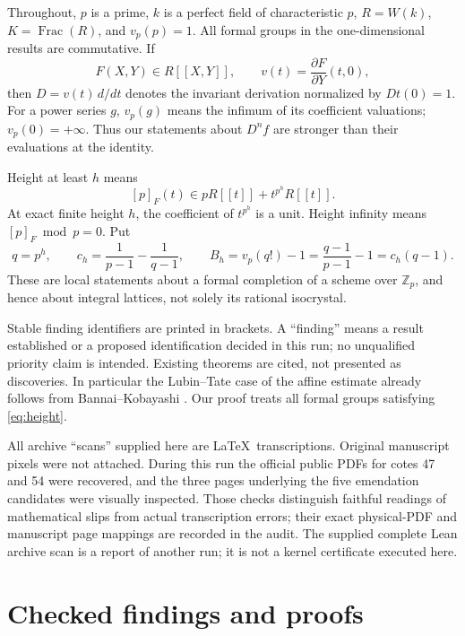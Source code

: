 \documentclass[11pt,a4paper]{article}
\theoremstyle{definition}\newtheorem{remark}[theorem]{Remark}
\newcommand{\Z}{\mathbb Z}\newcommand{\Q}{\mathbb Q}\newcommand{\F}{\mathbb F}
\newcommand{\vp}{v_p}\newcommand{\dR}{\mathrm{dR}}\newcommand{\crys}{\mathrm{crys}}
\begin{document}
Throughout, $p$ is a prime, $k$ is a perfect field of characteristic $p$, $R=W(k)$, $K=\operatorname{Frac}(R)$, and $\vp(p)=1$. All formal groups in the one-dimensional results are commutative. If
\[
 F(X,Y)\in R[[X,Y]],\qquad v(t)=\frac{\partial F}{\partial Y}(t,0),
\]
then $D=v(t)\,d/dt$ denotes the invariant derivation normalized by $Dt(0)=1$. For a power series $g$, $\vp(g)$ means the infimum of its coefficient valuations; $\vp(0)=+\infty$. Thus our statements about $D^n f$ are stronger than their evaluations at the identity.

Height at least $h$ means
\begin{equation}\label{eq:height}
 [p]_F(t)\in pR[[t]]+t^{p^h}R[[t]].
\end{equation}
At exact finite height $h$, the coefficient of $t^{p^h}$ is a unit. Height infinity means $[p]_F\bmod p=0$. Put
\begin{equation}\label{eq:constants}
 q=p^h,\qquad c_h=\frac1{p-1}-\frac1{q-1},\qquad
 B_h=\vp(q!)-1=\frac{q-1}{p-1}-1=c_h(q-1).
\end{equation}
These are local statements about a formal completion of a scheme over $\Z_p$, and hence about integral lattices, not solely its rational isocrystal.

Stable finding identifiers are printed in brackets. A ``finding'' means a result established or a proposed identification decided in this run; no unqualified priority claim is intended. Existing theorems are cited, not presented as discoveries. In particular the Lubin--Tate case of the affine estimate already follows from Bannai--Kobayashi \cite[\S2, p.~527; Propositions 3.3 and 3.5, pp.~529, 531]{BK}. Our proof treats all formal groups satisfying \eqref{eq:height}.

All archive ``scans'' supplied here are \LaTeX\ transcriptions. Original manuscript pixels were not attached. During this run the official public PDFs for cotes 47 and 54 were recovered, and the three pages underlying the five emendation candidates were visually inspected. Those checks distinguish faithful readings of mathematical slips from actual transcription errors; their exact physical-PDF and manuscript page mappings are recorded in the audit. The supplied complete Lean archive scan is a report of another run; it is not a kernel certificate executed here.

\part{Checked findings and proofs}
\end{document}
